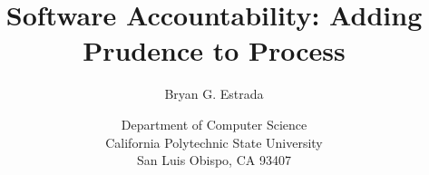 \documentclass[12pt]{article}
\begin{document}
\title{Software Accountability: Adding Prudence to Process}
\author{Bryan G. Estrada}
\date{Department of Computer Science\\
      California Polytechnic State University\\
      San Luis Obispo, CA  93407}
      
\begin{titlepage}
\vfill
\maketitle\thispagestyle{empty}
\vfill
\end{titlepage}

\doublespace
\newpage
\tableofcontents
\listoffigures
\listoftables
\newpage








\newpage


\end{document}
